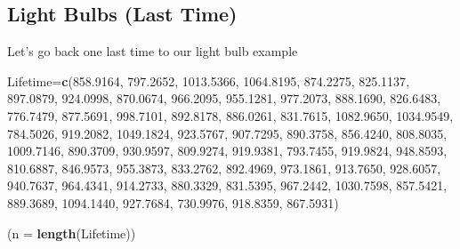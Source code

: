 \documentclass[
]{book}
\newenvironment{Shaded}{\begin{snugshade}}{\end{snugshade}}
\newcommand{\AttributeTok}[1]{\textcolor[rgb]{0.13,0.29,0.53}{#1}}
\newcommand{\FloatTok}[1]{\textcolor[rgb]{0.00,0.00,0.81}{#1}}
\newcommand{\FunctionTok}[1]{\textcolor[rgb]{0.13,0.29,0.53}{\textbf{#1}}}
\newcommand{\NormalTok}[1]{#1}
\newcommand{\OtherTok}[1]{\textcolor[rgb]{0.56,0.35,0.01}{#1}}
\begin{document}
\subsection{Light Bulbs (Last Time)}\label{light-bulbs-last-time}

Let's go back one last time to our light bulb example

\begin{Shaded}
\begin{Highlighting}[]
\NormalTok{Lifetime}\OtherTok{=}\FunctionTok{c}\NormalTok{(}\FloatTok{858.9164}\NormalTok{,  }\FloatTok{797.2652}\NormalTok{, }\FloatTok{1013.5366}\NormalTok{, }\FloatTok{1064.8195}\NormalTok{,  }\FloatTok{874.2275}\NormalTok{,  }\FloatTok{825.1137}\NormalTok{,}
           \FloatTok{897.0879}\NormalTok{,  }\FloatTok{924.0998}\NormalTok{,  }\FloatTok{870.0674}\NormalTok{,  }\FloatTok{966.2095}\NormalTok{,  }\FloatTok{955.1281}\NormalTok{,  }\FloatTok{977.2073}\NormalTok{,}
           \FloatTok{888.1690}\NormalTok{,  }\FloatTok{826.6483}\NormalTok{,  }\FloatTok{776.7479}\NormalTok{,  }\FloatTok{877.5691}\NormalTok{,  }\FloatTok{998.7101}\NormalTok{,  }\FloatTok{892.8178}\NormalTok{,}
           \FloatTok{886.0261}\NormalTok{,  }\FloatTok{831.7615}\NormalTok{, }\FloatTok{1082.9650}\NormalTok{, }\FloatTok{1034.9549}\NormalTok{,  }\FloatTok{784.5026}\NormalTok{,  }\FloatTok{919.2082}\NormalTok{,}
           \FloatTok{1049.1824}\NormalTok{,  }\FloatTok{923.5767}\NormalTok{,  }\FloatTok{907.7295}\NormalTok{,  }\FloatTok{890.3758}\NormalTok{,  }\FloatTok{856.4240}\NormalTok{,  }\FloatTok{808.8035}\NormalTok{,}
           \FloatTok{1009.7146}\NormalTok{,  }\FloatTok{890.3709}\NormalTok{,  }\FloatTok{930.9597}\NormalTok{,  }\FloatTok{809.9274}\NormalTok{,  }\FloatTok{919.9381}\NormalTok{,  }\FloatTok{793.7455}\NormalTok{,}
           \FloatTok{919.9824}\NormalTok{,  }\FloatTok{948.8593}\NormalTok{,  }\FloatTok{810.6887}\NormalTok{,  }\FloatTok{846.9573}\NormalTok{,  }\FloatTok{955.3873}\NormalTok{,  }\FloatTok{833.2762}\NormalTok{,}
           \FloatTok{892.4969}\NormalTok{,  }\FloatTok{973.1861}\NormalTok{,  }\FloatTok{913.7650}\NormalTok{,  }\FloatTok{928.6057}\NormalTok{,  }\FloatTok{940.7637}\NormalTok{,  }\FloatTok{964.4341}\NormalTok{,}
           \FloatTok{914.2733}\NormalTok{,  }\FloatTok{880.3329}\NormalTok{,  }\FloatTok{831.5395}\NormalTok{,  }\FloatTok{967.2442}\NormalTok{, }\FloatTok{1030.7598}\NormalTok{,  }\FloatTok{857.5421}\NormalTok{,}
           \FloatTok{889.3689}\NormalTok{, }\FloatTok{1094.1440}\NormalTok{,  }\FloatTok{927.7684}\NormalTok{,  }\FloatTok{730.9976}\NormalTok{,  }\FloatTok{918.8359}\NormalTok{,  }\FloatTok{867.5931}\NormalTok{)}

\NormalTok{(}\AttributeTok{n =} \FunctionTok{length}\NormalTok{(Lifetime))}
\end{Highlighting}
\end{Shaded}
\end{document}
